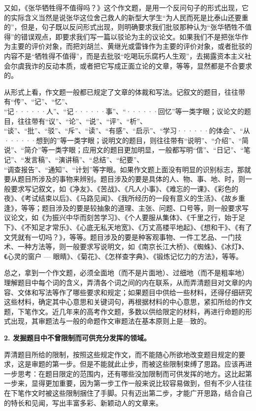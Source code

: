 又如，《张华牺牲得不值得吗？》这个作文题，是用一个反问句子的形式出现，它的实际含义当然是说张华这位舍己救人的新型大学生“为人民而死是比泰山还要重的”，但是，句子既以反问形式出现，则明确要求我们批驳那种认为“张华牺牲不值得”的错误观点，即要求我们写一篇以驳论为主的议论文。如果我们不是把张华作为主要的评价对象，而把刘胡兰、黄继光或雷锋作为主要的评价对象，或者批驳的内容不是“牺牲得不值得”，而是去批驳“吃喝玩乐腐朽人生观”，去揭露资本主义社会尔虞我诈的反动本质，或者把它写成正面立论的文章，等等，显然都是不合要求的。

从形式上看，作文题一般都已规定了文章的体裁和写法。记叙文的题目，往往带有“传”、“记”、“忆”、\\ 
“记······人”、“记······事”、“······回忆”等一类字眼；议论文的题目，往往带有“议”、“论”、“说”、“评”、“析”、\\ 
“谈”、“批”、“驳”、“斥”、“读”、“有感”、“启示”、“学习······的体会”、“从······想到的”等一类字眼；说明文的题目，则往往带有“说明”、“介绍”、“简说”、“简介”等一类字眼；应用文的题目更加明显，一般都写明“信”、“日记”、“笔记”、“发言稿”、“演讲稿”、“总结”、“纪要”、\\
“调查报告”、“通知”、“计划”等字眼。如果作文题上面没有明显的识别标志，那就要从题目所涉及的事物来辨别。题目涉及的要是具体的人、物、事、地、时，则一般要求写记叙文，如《净友》、《苦战》、《凡人小事》、《难忘的一课》、《彩色的夜》、《考试结束以后》、《马路见闻》、《我所经历的一段有意义的生活》、《故乡重逢》，等等；题目涉及的要是较抽象的道理、主张、问题、口号等，则一般要求写议论文，如《为振兴中华而刻苦学习》、《个人要服从集体》、《千里之行，始于足下》、《不知足才常乐》、《心底无私天地宽》、《万丈高楼平地起》、《想和干》、《有了文凭就有一切吗？》，等等。题目涉及的要是种客观事物、一件工艺品、一门技术、一种方法等，则一般要求写说明文，如《南京长江大桥》、《蜘蛛》、《冰灯》、《心灵的窗户 --- 眼睛》、《菊花》、《怎样查字典》、《锻炼记忆力的方法》，等等。

总之，拿到一个作文题，必须全面地（而不是片面地）、过细地（而不是粗率地）理解题目中每个词的含义，弄清各个词之间的内在联系，从而弄清题目对文章的内容、文体和写法等作了哪些要求和规定；如果题目中供给一些材料，还得仔细研究这些材料，确定其中心意思和关键词句，再根据材料的中心意思，紧扣所给的作文题，下笔作文。近几年来的高考作文题，多数以供给限定的材料，再进行命题的形式出现，其审题法与一般的命题作文审题法在基本原则上是—致的。

\textbf{2. 发掘题目中不曾限制而可供充分发挥的领域。}

弄清题目所给的限制，按照这些规定作文，而不能随心所欲地改变题目规定的要求，这是审题的第一步。但是不能就此止步，而被这些限制束缚了思路。应该再进一步思考：在题目限定的范围内，还有哪些没加限制而可供发挥的地方。这比起第一步来，显得更加重要，因为第一步工作一般来说比较容易做到，但有不少人往往在下笔作文时被这些限制捆住了手脚。只有迈出第二步，才能广开思路，结合自己的特长和见闻，写出丰富多彩、新颖动人的文章来。


